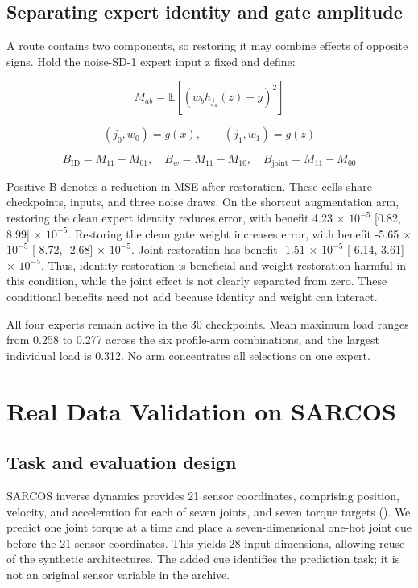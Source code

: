\documentclass[10pt,letterpaper]{article}
\begin{document}
\subsection{Separating expert identity and gate amplitude}

A route contains two components, so restoring it may combine effects of opposite signs. Hold the noise-SD-1 expert input z fixed and define:


\[
M_{ab}=\mathbb{E}[(w_b h_{j_a}(z)-y)^2]
\]

\[
(j_0,w_0)=g(x),\qquad(j_1,w_1)=g(z)
\]

\[
B_{\mathrm{ID}}=M_{11}-M_{01},\quad B_w=M_{11}-M_{10},\quad B_{\mathrm{joint}}=M_{11}-M_{00}
\]

Positive B denotes a reduction in MSE after restoration. These cells share checkpoints, inputs, and three noise draws. On the shortcut augmentation arm, restoring the clean expert identity reduces error, with benefit 4.23 \ensuremath{\times} $10^{-5}$ [0.82, 8.99] \ensuremath{\times} $10^{-5}$. Restoring the clean gate weight increases error, with benefit -5.65 \ensuremath{\times} $10^{-5}$ [-8.72, -2.68] \ensuremath{\times} $10^{-5}$. Joint restoration has benefit -1.51 \ensuremath{\times} $10^{-5}$ [-6.14, 3.61] \ensuremath{\times} $10^{-5}$. Thus, identity restoration is beneficial and weight restoration harmful in this condition, while the joint effect is not clearly separated from zero. These conditional benefits need not add because identity and weight can interact.


All four experts remain active in the 30 checkpoints. Mean maximum load ranges from 0.258 to 0.277 across the six profile-arm combinations, and the largest individual load is 0.312. No arm concentrates all selections on one expert.


\FloatBarrier

\section{Real Data Validation on SARCOS}

\subsection{Task and evaluation design}

SARCOS inverse dynamics provides 21 sensor coordinates, comprising position, velocity, and acceleration for each of seven joints, and seven torque targets (\citealp{vijayakumar2005}). We predict one joint torque at a time and place a seven-dimensional one-hot joint cue before the 21 sensor coordinates. This yields 28 input dimensions, allowing reuse of the synthetic architectures. The added cue identifies the prediction task; it is not an original sensor variable in the archive.
\end{document}
